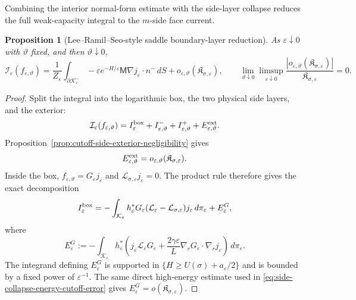 \documentclass[11pt]{article}
\numberwithin{equation}{section}
\theoremstyle{plain}
\newtheorem{proposition}[theorem]{Proposition}
\theoremstyle{definition}
\theoremstyle{remark}
\newcommand{\eps}{\varepsilon}
\newcommand{\calL}{\mathcal L}
\begin{document}
Combining the interior normal-form estimate with the side-layer
collapse reduces the full weak-capacity integral to the $m$-side face
current.

\begin{proposition}[Lee--Ramil--Seo-style saddle boundary-layer reduction]
\label{prop:saddle-boundary-layer-reduction}
As $\eps\downarrow0$ with $\vartheta$ fixed, and then $\vartheta\downarrow0$,
\[
\mathcal I_\eps(f_{\eps,\vartheta})
=\frac1{Z_\eps}\int_{\partial\mathcal K_\eps^-}-\eps e^{-H/\eps}\mathsf M\nabla j_\eps\cdot n^-\,dS
+o_{\eps,\vartheta}(\mathfrak K_{\sigma,\eps}),
\qquad
\lim_{\vartheta\downarrow0}\limsup_{\eps\downarrow0}\frac{|o_{\eps,\vartheta}(\mathfrak K_{\sigma,\eps})|}{\mathfrak K_{\sigma,\eps}}=0 .
\]
\end{proposition}

\begin{proof}
Split the integral into the logarithmic box, the two physical side layers,
and the exterior:
\begin{equation}
\label{eq:saddle-boundary-layer-decomposition}
\mathcal I_\eps(f_{\eps,\vartheta})
=I_\eps^{\rm box}+I_{\eps,\vartheta}^-+I_{\eps,\vartheta}^+
+E_{\eps,\vartheta}^{\rm ext}.
\end{equation}
Proposition~\ref{prop:cutoff-side-exterior-negligibility} gives
\begin{equation}
\label{eq:saddle-boundary-layer-exterior}
E_{\eps,\vartheta}^{\rm ext}
=o_{\eps,\vartheta}(\mathfrak K_{\sigma,\eps}).
\end{equation}
Inside the box, $f_{\eps,\vartheta}=G_\eps j_\eps$ and
$\calL_{\sigma,\eps}j_\eps=0$.  The product rule therefore gives the exact
decomposition
\[
I_\eps^{\rm box}
=-\int_{\mathcal K_\eps}h_\eps^*
G_\eps(\calL_\eps-\calL_{\sigma,\eps})j_\eps\,d\pi_\eps
+E_\eps^G,
\]
where
\[
E_\eps^G
:=-\int_{\mathcal K_\eps}h_\eps^*
\left(j_\eps\calL_\eps G_\eps
+\frac{2\gamma\eps}{L}\nabla_rG_\eps\cdot\nabla_rj_\eps\right)
\,d\pi_\eps.
\]
The integrand defining $E_\eps^G$ is supported in
$\{H\ge U(\sigma)+a_\eps/2\}$ and is bounded by a fixed power of
$\eps^{-1}$.  The same direct high-energy estimate used in
\eqref{eq:side-collapse-energy-cutoff-error} gives
$E_\eps^G=o(\mathfrak K_{\sigma,\eps})$.


\end{proof}
\end{document}
